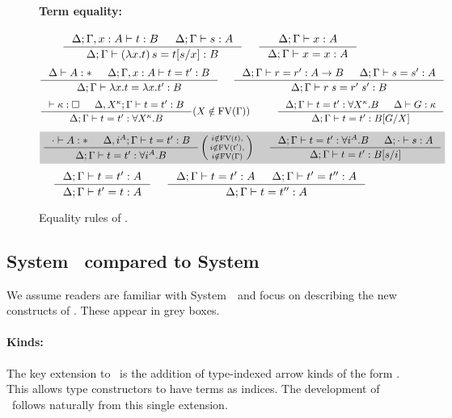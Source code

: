 \begin{figure}
\begin{singlespace}
\paragraph{Term equality:} 
\[
   \inference{\Delta;\Gamma,x:A |- t:B & \Delta;\Gamma |- s:A}{
              \Delta;\Gamma |- (\lambda x.t)\,s=t[s/x] : B}
 ~~~~
   \inference{\Delta;\Gamma |- x:A}{\Delta;\Gamma |- x=x:A}
\]
\[ \inference{\Delta |- A:* & \Delta;\Gamma,x:A |- t=t':B}{
              \Delta;\Gamma |- \lambda x.t = \lambda x.t':B}
 ~~~~
   \inference{\Delta;\Gamma |- r=r':A-> B & \Delta;\Gamma |- s=s':A}{
              \Delta;\Gamma |- r\;s=r'\;s':B}
\]
\[ \inference{|- \kappa:\square & \Delta, X^\kappa;\Gamma |- t=t' : B}{
              \Delta;\Gamma |- t=t' : \forall X^\kappa.B}
	     (X\notin\FV(\Gamma))
 ~~~~ ~~~~
   \inference{ \Delta;\Gamma |- t=t' : \forall X^\kappa.B
             & \Delta |- G:\kappa }{
              \Delta;\Gamma |- t=t' : B[G/X]}
\]
\[ \newFi{
   \inference{\cdot |- A:* & \Delta, i^A;\Gamma |- t=t' : B}{
              \Delta;\Gamma |- t=t' : \forall i^A.B}
   \left(\begin{smallmatrix}
		i\notin\FV(t),\\
		i\notin\FV(t'),\\
		i\notin\FV(\Gamma)\end{smallmatrix}\right)
 ~~~~
   \inference{ \Delta;\Gamma |- t=t' : \forall i^A.B
             & \Delta;\cdot |- s:A}{
              \Delta;\Gamma |- t=t' : B[s/i]} }
\]
\[ \inference{\Delta;\Gamma |- t=t':A}{\Delta;\Gamma |- t'=t:A}
 ~~~~
   \inference{\Delta;\Gamma |- t=t':A & \Delta;\Gamma |- t'=t'':A}{
              \Delta;\Gamma |- t=t'':A}
\]
\end{singlespace}
\caption{Equality rules of \Fi.}
\label{fig:eqFi}
\end{figure}

\subsection{%
	System \Fi\ compared to System \Fw} \label{ssec:newFi}
We assume readers are familiar with System~\Fw\
and focus on describing the new constructs of \Fi.  These appear in grey boxes.


\paragraph{Kinds:}
The key extension to \Fw\ is the addition of type-indexed arrow kinds of
the form \newFi{A -> \kappa}. This allows type constructors to have terms
as indices. The development of \Fi\ follows naturally from
this single extension.

